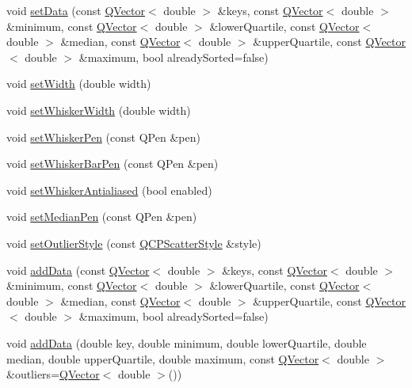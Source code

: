 \begin{DoxyCompactItemize}
\item 
void \hyperlink{class_q_c_p_statistical_box_a4ae198e66243d8cc57ad8893c37bf9d4}{set\+Data} (const \hyperlink{class_q_vector}{Q\+Vector}$<$ double $>$ \&keys, const \hyperlink{class_q_vector}{Q\+Vector}$<$ double $>$ \&minimum, const \hyperlink{class_q_vector}{Q\+Vector}$<$ double $>$ \&lower\+Quartile, const \hyperlink{class_q_vector}{Q\+Vector}$<$ double $>$ \&median, const \hyperlink{class_q_vector}{Q\+Vector}$<$ double $>$ \&upper\+Quartile, const \hyperlink{class_q_vector}{Q\+Vector}$<$ double $>$ \&maximum, bool already\+Sorted=false)
\item 
void \hyperlink{class_q_c_p_statistical_box_a0b62775bd67301b1eba5c785f2b26f14}{set\+Width} (double width)
\item 
void \hyperlink{class_q_c_p_statistical_box_adf378812446bd66f34d1f7f293d991cd}{set\+Whisker\+Width} (double width)
\item 
void \hyperlink{class_q_c_p_statistical_box_a4a5034cb3b9b040444df05ab1684620b}{set\+Whisker\+Pen} (const Q\+Pen \&pen)
\item 
void \hyperlink{class_q_c_p_statistical_box_aa8d3e503897788e1abf68dc74b5f147f}{set\+Whisker\+Bar\+Pen} (const Q\+Pen \&pen)
\item 
void \hyperlink{class_q_c_p_statistical_box_a61bcd458fba002f72304d11319051843}{set\+Whisker\+Antialiased} (bool enabled)
\item 
void \hyperlink{class_q_c_p_statistical_box_a7260ac55b669f5d0a74f16d5ca84c52c}{set\+Median\+Pen} (const Q\+Pen \&pen)
\item 
void \hyperlink{class_q_c_p_statistical_box_ad5241943422eb8e58360a97e99ad6aa7}{set\+Outlier\+Style} (const \hyperlink{class_q_c_p_scatter_style}{Q\+C\+P\+Scatter\+Style} \&style)
\item 
void \hyperlink{class_q_c_p_statistical_box_a9a8739c5b8291db8fd839e892fc8f478}{add\+Data} (const \hyperlink{class_q_vector}{Q\+Vector}$<$ double $>$ \&keys, const \hyperlink{class_q_vector}{Q\+Vector}$<$ double $>$ \&minimum, const \hyperlink{class_q_vector}{Q\+Vector}$<$ double $>$ \&lower\+Quartile, const \hyperlink{class_q_vector}{Q\+Vector}$<$ double $>$ \&median, const \hyperlink{class_q_vector}{Q\+Vector}$<$ double $>$ \&upper\+Quartile, const \hyperlink{class_q_vector}{Q\+Vector}$<$ double $>$ \&maximum, bool already\+Sorted=false)
\item 
void \hyperlink{class_q_c_p_statistical_box_a026f2790b530d6f29312254ecb1e7c1e}{add\+Data} (double key, double minimum, double lower\+Quartile, double median, double upper\+Quartile, double maximum, const \hyperlink{class_q_vector}{Q\+Vector}$<$ double $>$ \&outliers=\hyperlink{class_q_vector}{Q\+Vector}$<$ double $>$())

\end{DoxyCompactItemize}

